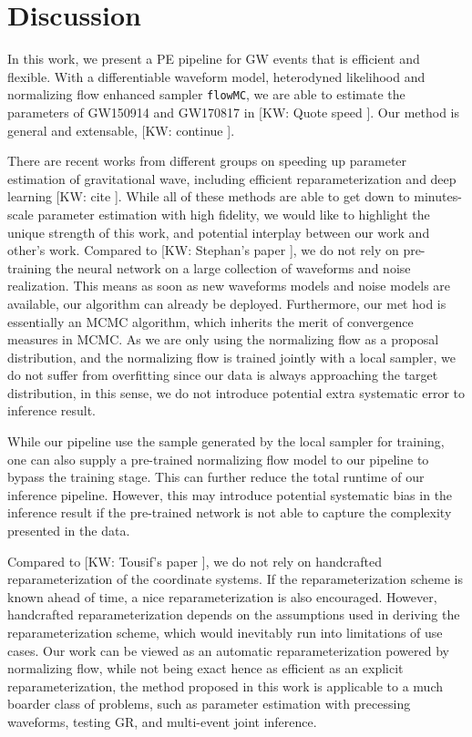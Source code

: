 \documentclass[twocolumn]{aastex631}
\newcommand{\kw}[1]{{\color{rb4}[KW: #1 ]}}
\begin{document}
\section{Discussion}
\label{sec: Discussion}

In this work, we present a PE pipeline for GW events that is efficient and
flexible. With a differentiable waveform model, heterodyned likelihood and
normalizing flow enhanced sampler \texttt{flowMC}, we are able to estimate the
parameters of GW150914 and GW170817 in \kw{Quote speed}. Our method is general
and extensable, \kw{continue}.

There are recent works from different groups on speeding up parameter estimation
of gravitational wave, including efficient reparameterization and deep learning
\kw{cite}. While all of these methods are able to get down to minutes-scale parameter
estimation with high fidelity, we would like to highlight the unique strength of
this work, and potential interplay between our work and other's work.
Compared to \kw{Stephan's paper}, we do not rely on pre-training the
neural network on a large collection of waveforms and noise realization. This
means as soon as new waveforms models and noise models are available, our
algorithm can already be deployed. Furthermore, our met hod is essentially an
MCMC algorithm, which inherits the merit of convergence measures in MCMC. As we
are only using the normalizing flow as a proposal distribution, and the
normalizing flow is trained jointly with a local sampler, we do not suffer from
overfitting since our data is always approaching the target distribution, in
this sense, we do not introduce potential extra systematic error to inference
result.

While our pipeline use the sample generated by the local sampler for training,
one can also supply a pre-trained normalizing flow model to our pipeline to
bypass the training stage. This can further reduce the total runtime of our
inference pipeline. However, this may introduce potential systematic bias in the
inference result if the pre-trained network is not able to capture the
complexity presented in the data.

Compared to \kw{Tousif's paper}, we do not rely on handcrafted
reparameterization of the coordinate systems. If the reparameterization scheme
is known ahead of time, a nice reparameterization is also encouraged. However,
handcrafted reparameterization depends on the assumptions used in deriving the
reparameterization scheme, which would inevitably run into limitations of use
cases. Our work can be viewed as an automatic reparameterization powered by
normalizing flow, while not being exact hence as efficient as an explicit
reparameterization, the method proposed in this work is applicable to a much
boarder class of problems, such as parameter estimation with precessing
waveforms, testing GR, and multi-event joint inference.
\end{document}
